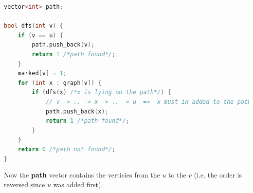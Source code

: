 \begin{lstlisting}[language=C++]
vector<int> path;

bool dfs(int v) {
    if (v == u) {
        path.push_back(v);
        return 1 /*path found*/;
    }
    marked[v] = 1;
    for (int x : graph[v]) {
        if (dfs(x) /*x is lying on the path*/) {
            // v -> .. -> x -> .. -> u  =>  x must in added to the path
            path.push_back(x);
            return 1 /*path found*/;
        }
    }
    return 0 /*path not found*/;
}
\end{lstlisting}

Now the \textbf{path} vector contains the verticies from the $u$ to the $v$ (i.e. the order is reversed since $u$ was added first).


